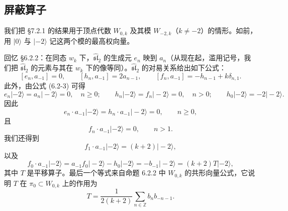 
\subsection{屏蔽算子}

我们把 §7.2.1 的结果用于顶点代数 $W_{0,k}$ 及其模 $W_{-2,k}$（$k\ne-2$）的情形。如前，用 $|0\rangle$ 与 $|-2\rangle$ 记这两个模的最高权向量。

回忆 §6.2.2：在同态 $w_k$ 下，$\widehat{\mathfrak{sl}}_2$ 的生成元 $e_n$ 映到 $a_n$（从现在起，滥用记号，我们把 $\widehat{\mathfrak{sl}}_2$ 的元素与其在 $w_k$ 下的像等同）。$\widehat{\mathfrak{sl}}_2$ 的对易关系给出如下公式：
\[
    [e_n,a_{-1}]=0,\qquad[h_n,a_{-1}]=2a_{n-1},\qquad[f_n,a_{-1}]=-h_{n-1}+k\delta_{n,1}.
\]
此外，由公式 (6.2-3) 可得
\[
    e_n|-2\rangle=a_n|-2\rangle=0,\quad n\ge0;\qquad
    h_n|-2\rangle=f_n|-2\rangle=0,\quad n>0;\qquad
    h_0|-2\rangle=-2|-2\rangle.
\]
因此
\[
    e_n\cdot a_{-1}|-2\rangle=h_n\cdot a_{-1}|-2\rangle=0,\qquad n\ge0,
\]
且
\[
    f_n\cdot a_{-1}|-2\rangle=0,\qquad n>1.
\]
我们还得到
\[
    f_1\cdot a_{-1}|-2\rangle=(k+2)|-2\rangle,
\]
以及
\begin{equation}
    f_0\cdot a_{-1}|-2\rangle=a_{-1}f_0|-2\rangle-h_0|-2\rangle=-b_{-1}|-2\rangle=(k+2)T|-2\rangle,
    \tag{7.2-5}
\end{equation}
其中 $T$ 是平移算子。最后一个等式来自命题 6.2.2 中 $W_{0,k}$ 的共形向量公式，它说明 $T$ 在 $\pi_0\subset W_{0,k}$ 上的作用为
\[
    T=\frac{1}{2(k+2)}\sum_{n\in\mathbb{Z}}b_nb_{-n-1}.
\]

